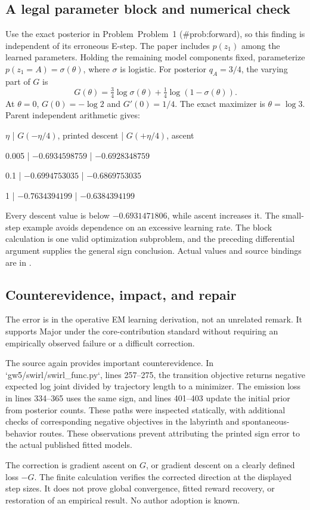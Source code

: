 \documentclass[10pt]{article}
\begin{document}
\subsection*{A legal parameter block and numerical check}
Use the exact posterior in Problem Problem 1 (\#prob:forward), so this finding is independent of its erroneous E-step. The paper includes \(p(z_1)\) among the learned parameters. Holding the remaining model components fixed, parameterize \(p(z_1=A)=\sigma(\theta)\), where \(\sigma\) is logistic. For posterior \(q_A=3/4\), the varying part of \(G\) is \[G(\theta)=\tfrac34\log\sigma(\theta)
+\tfrac14\log(1-\sigma(\theta)).\] At \(\theta=0\), \(G(0)=-\log2\) and \(G'(0)=1/4\). The exact maximizer is \(\theta=\log3\). Parent independent arithmetic gives:\par
\(\eta\) | \(G(-\eta/4)\), printed descent | \(G(+\eta/4)\), ascent\par
0.005 | \(-0.6934598759\) | \(-0.6928348759\)\par
0.1 | \(-0.6994753035\) | \(-0.6869753035\)\par
1 | \(-0.7634394199\) | \(-0.6384394199\)\par
Every descent value is below \(-0.6931471806\), while ascent increases it. The small-step example avoids dependence on an excessive learning rate. The block calculation is one valid optimization subproblem, and the preceding differential argument supplies the general sign conclusion. Actual values and source bindings are in .\par
\subsection*{Counterevidence, impact, and repair}
The error is in the operative EM learning derivation, not an unrelated remark. It supports Major under the core-contribution standard without requiring an empirically observed failure or a difficult correction.\par
The source again provides important counterevidence. In `gw5/swirl/swirl\_func.py`, lines 257–275, the transition objective returns negative expected log joint divided by trajectory length to a minimizer. The emission loss in lines 334–365 uses the same sign, and lines 401–403 update the initial prior from posterior counts. These paths were inspected statically, with additional checks of corresponding negative objectives in the labyrinth and spontaneous-behavior routes. These observations prevent attributing the printed sign error to the actual published fitted models.\par
The correction is gradient ascent on \(G\), or gradient descent on a clearly defined loss \(-G\). The finite calculation verifies the corrected direction at the displayed step sizes. It does not prove global convergence, fitted reward recovery, or restoration of an empirical result. No author adoption is known.\par
\end{document}
